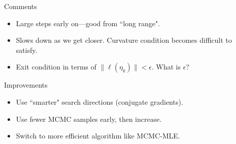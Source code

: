 \documentclass[ 10pt]{beamer}
\begin{document}
{\begin{columns}[]
\begin{column}[T]{0.55\textwidth}
{\begin{table}
\begin{center}
\begin{tabular}{rrrrrrr}
   \hline
\end{tabular}
\end{center}
\end{table}
}
\end{column}
\begin{column}[T]{0.5\textwidth}
\pause
Comments
\begin{itemize}
\item Large steps early on---good from ``long range".
\item Slows down as we get closer.  Curvature condition becomes difficult to satisfy.
\item Exit condition in terms of $\lVert \ell (\eta_k) \rVert < \epsilon.$  What is $\epsilon$?
\end{itemize}
\vspace{2mm}
\pause

Improvements
\begin{itemize}
\item Use ``smarter" search directions (conjugate gradients).
\item Use fewer MCMC samples early, then increase.
\item Switch to more efficient algorithm like MCMC-MLE.  
\end{itemize}


\end{column}
\end{columns}
}





\end{document}
